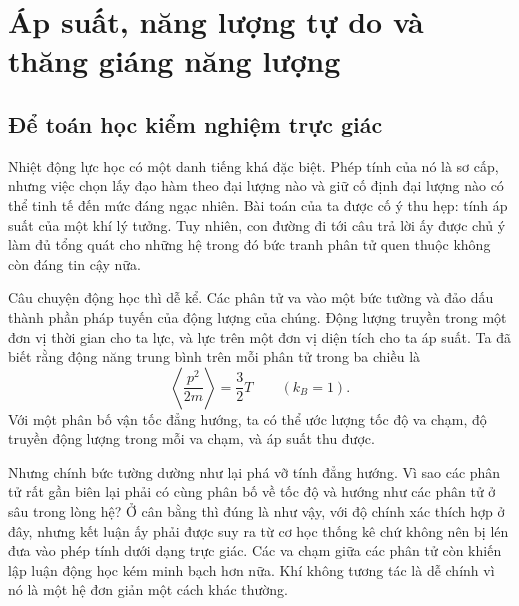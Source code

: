 \chapter{Áp suất, năng lượng tự do và thăng giáng năng lượng}


\section{Để toán học kiểm nghiệm trực giác}

Nhiệt động lực học có một danh tiếng khá đặc biệt. Phép tính của nó là sơ cấp, nhưng việc chọn lấy đạo hàm theo đại lượng nào và giữ cố định đại lượng nào có thể tinh tế đến mức đáng ngạc nhiên. Bài toán của ta được cố ý thu hẹp: tính áp suất của một khí lý tưởng. Tuy nhiên, con đường đi tới câu trả lời ấy được chủ ý làm đủ tổng quát cho những hệ trong đó bức tranh phân tử quen thuộc không còn đáng tin cậy nữa.

Câu chuyện động học thì dễ kể. Các phân tử va vào một bức tường và đảo dấu thành phần pháp tuyến của động lượng của chúng. Động lượng truyền trong một đơn vị thời gian cho ta lực, và lực trên một đơn vị diện tích cho ta áp suất. Ta đã biết rằng động năng trung bình trên mỗi phân tử trong ba chiều là
\begin{equation}
 \left\langle \frac{p^2}{2m}\right\rangle=\frac{3}{2}T
 \qquad (k_B=1).
 \label{eq:sm5-mean-kinetic-energy}
\end{equation}
Với một phân bố vận tốc đẳng hướng, ta có thể ước lượng tốc độ va chạm, độ truyền động lượng trong mỗi va chạm, và áp suất thu được.

Nhưng chính bức tường dường như lại phá vỡ tính đẳng hướng. Vì sao các phân tử rất gần biên lại phải có cùng phân bố về tốc độ và hướng như các phân tử ở sâu trong lòng hệ? Ở cân bằng thì đúng là như vậy, với độ chính xác thích hợp ở đây, nhưng kết luận ấy phải được suy ra từ cơ học thống kê chứ không nên bị lén đưa vào phép tính dưới dạng trực giác. Các va chạm giữa các phân tử còn khiến lập luận động học kém minh bạch hơn nữa. Khí không tương tác là dễ chính vì nó là một hệ đơn giản một cách khác thường.

